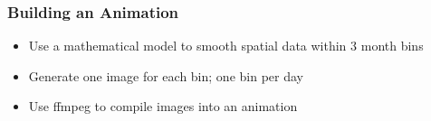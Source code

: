 \documentclass[xcolor=dvipsnames, 9pt]{beamer}
\begin{document}
\begin{frame}[fragile]
  \frametitle{Building an Animation}
  
  \begin{itemize}
    \item{Use a mathematical model to smooth spatial data within 3 month bins}
    \item{Generate one image for each bin; one bin per day}
    \item{Use ffmpeg to compile images into an animation}
  \end{itemize}
\end{frame}


\end{document}

